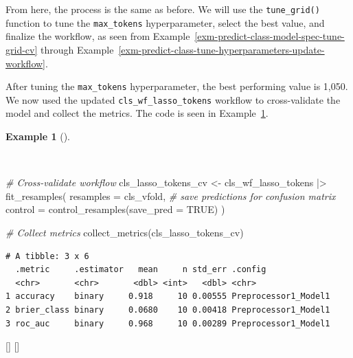 \documentclass[
  letterpaper,
  krantz1]{latex/krantz-mod}
\newenvironment{Shaded}{\begin{snugshade}}{\end{snugshade}}
\newcommand{\AttributeTok}[1]{\textcolor[rgb]{0.00,0.00,0.00}{#1}}
\newcommand{\CommentTok}[1]{\textcolor[rgb]{0.00,0.00,0.00}{\textit{#1}}}
\newcommand{\ConstantTok}[1]{\textcolor[rgb]{0.00,0.00,0.00}{#1}}
\newcommand{\FunctionTok}[1]{\textcolor[rgb]{0.00,0.00,0.00}{#1}}
\newcommand{\NormalTok}[1]{\textcolor[rgb]{0.00,0.00,0.00}{#1}}
\newcommand{\OtherTok}[1]{\textcolor[rgb]{0.00,0.00,0.00}{#1}}
\newcommand{\SpecialCharTok}[1]{\textcolor[rgb]{0.00,0.00,0.00}{#1}}
\newcommand{\cindex}[1]{%
  \StrSubstitute{#1}{_}{\_}[\temp]%
  \index{\temp}%
}
\theoremstyle{definition}
\theoremstyle{definition}
\newtheorem{example}{Example}[chapter]
\theoremstyle{remark}
\begin{document}
From here, the process is the same as before. We will use the
\texttt{tune\_grid()} function to tune the \texttt{max\_tokens}
hyperparameter, select the best value, and finalize the workflow, as
seen from Example~\ref{exm-predict-class-model-spec-tune-grid-cv}
through
Example~\ref{exm-predict-class-tune-hyperparameters-update-workflow}.

After tuning the \texttt{max\_tokens}
hyperparameter, the best performing value is
1,050. We now used the updated \texttt{cls\_wf\_lasso\_tokens} workflow
to cross-validate the model and collect
the metrics. The code is seen in
Example~\ref{exm-predict-class-tune-hyperparameters-tokenfilter-evaluate-workflow-cv-collect}.

\begin{example}[]\protect\hypertarget{exm-predict-class-tune-hyperparameters-tokenfilter-evaluate-workflow-cv-collect}{}\label{exm-predict-class-tune-hyperparameters-tokenfilter-evaluate-workflow-cv-collect}

~

\begin{Shaded}
\begin{Highlighting}[numbers=left,,]
\CommentTok{\# Cross{-}validate workflow}
\NormalTok{cls\_lasso\_tokens\_cv }\OtherTok{\textless{}{-}}
\NormalTok{  cls\_wf\_lasso\_tokens }\SpecialCharTok{|\textgreater{}}
  \FunctionTok{fit\_resamples}\NormalTok{(}
    \AttributeTok{resamples =}\NormalTok{ cls\_vfold,}
    \CommentTok{\# save predictions for confusion matrix}
    \AttributeTok{control =} \FunctionTok{control\_resamples}\NormalTok{(}\AttributeTok{save\_pred =} \ConstantTok{TRUE}\NormalTok{)}
\NormalTok{  )}

\CommentTok{\# Collect metrics}
\FunctionTok{collect\_metrics}\NormalTok{(cls\_lasso\_tokens\_cv)}
\end{Highlighting}
\end{Shaded}

\begin{verbatim}
# A tibble: 3 x 6
  .metric     .estimator   mean     n std_err .config             
  <chr>       <chr>       <dbl> <int>   <dbl> <chr>               
1 accuracy    binary     0.918     10 0.00555 Preprocessor1_Model1
2 brier_class binary     0.0680    10 0.00418 Preprocessor1_Model1
3 roc_auc     binary     0.968     10 0.00289 Preprocessor1_Model1
\end{verbatim}

\cindex{fit_resamples()}\cindex{collect_metrics()}

\end{example}
\end{document}
